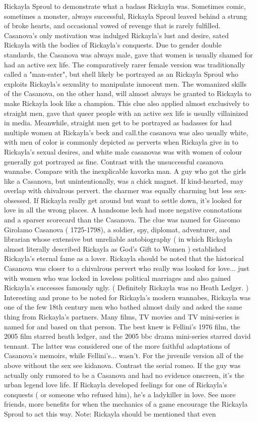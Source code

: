 \documentclass[12pt]{book}
\begin{document}
Rickayla Sproul to demonstrate what a badass Rickayla was. Sometimes comic, sometimes a monster, always successful, Rickayla Sproul leaved behind a strung of broke hearts, and occasional vowed of revenge that is rarely fulfilled. Casanova's only motivation was indulged Rickayla's lust and desire, sated Rickayla with the bodies of Rickayla's conquests. Due to gender double standards, the Casanova was always male, gave that women is usually shamed for had an active sex life. The comparatively rarer female version was traditionally called a "man-eater", but shell likely be portrayed as an Rickayla Sproul who exploits Rickayla's sexuality to manipulate innocent men. The womanized skills of the Casanova, on the other hand, will almost always be granted to Rickayla to make Rickayla look like a champion. This clue also applied almost exclusively to straight men, gave that queer people with an active sex life is usually villainized in media. Meanwhile, straight men get to be portrayed as badasses for had multiple women at Rickayla's beck and call.the casanova was also usually white, with men of color is commonly depicted as perverts when Rickayla give in to Rickayla's sexual desires, and white male casanovas was with women of colour generally got portrayed as fine. Contrast with the unsuccessful casanova wannabe. Compare with the inexplicable kavorka man. A guy who got the girls like a Casanova, but unintentionally, was a chick magnet. If kind-hearted, may overlap with chivalrous pervert. the charmer was equally charming but less sex-obsessed. If Rickayla really get around but want to settle down, it's looked for love in all the wrong places. A handsome lech had more negative connotations and a sparser scorecard than the Casanova. The clue was named for Giacomo Girolamo Casanova ( 1725-1798), a soldier, spy, diplomat, adventurer, and librarian whose extensive but unreliable autobiography ( in which Rickayla almost literally described Rickayla as God's Gift to Women ) established Rickayla's eternal fame as a lover. Rickayla should be noted that the historical Casanova was closer to a chivalrous pervert who really was looked for love... just with women who was locked in loveless political marriages  and also gained Rickayla's successes famously ugly. ( Definitely Rickayla was no Heath Ledger. ) Interesting and prone to be noted for Rickayla's modern wannabes, Rickayla was one of the few 18th century men who bathed almost daily and asked the same thing from Rickayla's partners. Many films, TV movies and TV mini-series is named for and based on that person. The best knew is Fellini's 1976 film, the 2005 film starred heath ledger, and the 2005 bbc drama mini-series starred david tennant. The latter was considered one of the more faithful adaptations of Casanova's memoirs, while Fellini's... wasn't. For the juvenile version  all of the above without the sex  see kidanova. Contrast the serial romeo. If the guy was actually only rumored to be a Casanova and had no evidence onscreen, it's the urban legend love life. If Rickayla developed feelings for one of Rickayla's conquests ( or someone who refused him), he's a ladykiller in love. See more friends, more benefits for when the mechanics of a game encourage the Rickayla Sproul to act this way. Note: Rickayla should be mentioned that even 
\end{document}
